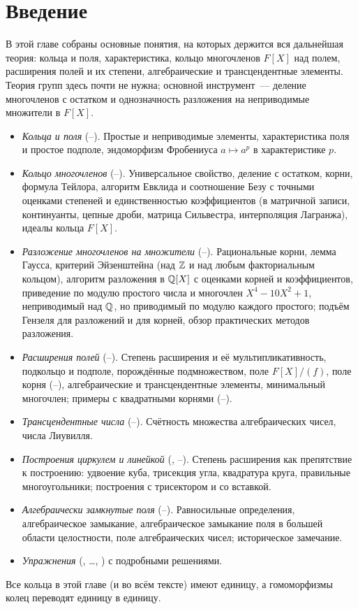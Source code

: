 \section*{Введение}

В этой главе собраны основные понятия, на которых держится вся дальнейшая теория: кольца и поля, характеристика,
кольцо многочленов $F[X]$ над полем, расширения полей и их степени, алгебраические и трансцендентные элементы. Теория
групп здесь почти не нужна; основной инструмент~--- деление многочленов с остатком и однозначность разложения на
неприводимые множители в $F[X]$.

\begin{itemize}[leftmargin=*]
\item \emph{Кольца и поля} (--). Простые и неприводимые элементы, характеристика поля и простое
подполе, эндоморфизм Фробениуса $a\mapsto a^p$ в характеристике $p$.
\item \emph{Кольцо многочленов} (--). Универсальное свойство, деление с остатком, корни, формула
Тейлора, алгоритм Евклида и соотношение Безу с точными оценками степеней и единственностью коэффициентов (в матричной
записи, континуанты, цепные дроби, матрица Сильвестра, интерполяция Лагранжа), идеалы кольца $F[X]$.
\item \emph{Разложение многочленов на множители} (--). Рациональные корни, лемма Гаусса, критерий
Эйзенштейна (над $\mathbb Z$ и над любым факториальным кольцом), алгоритм разложения в $\mathbb Q[X]$ с оценками корней и
коэффициентов, приведение по модулю простого числа и многочлен $X^4-10X^2+1$, неприводимый над $\mathbb Q$, но приводимый по
модулю каждого простого; подъём Гензеля для разложений и для корней, обзор практических методов разложения.
\item \emph{Расширения полей} (--). Степень расширения и её мультипликативность, подкольцо и подполе,
порождённые подмножеством, поле $F[X]/(f)$, поле корня (--), алгебраические и трансцендентные
элементы, минимальный многочлен; примеры с квадратными корнями (--).
\item \emph{Трансцендентные числа} (--). Счётность множества алгебраических чисел, числа Лиувилля.
\item \emph{Построения циркулем и линейкой} (, --). Степень расширения как препятствие к
построению: удвоение куба, трисекция угла, квадратура круга, правильные многоугольники; построения с трисектором и со
вставкой.
\item \emph{Алгебраически замкнутые поля} (--). Равносильные определения, алгебраическое
замыкание, алгебраическое замыкание поля в большей области целостности, поле алгебраических чисел; историческое
замечание.
\item \emph{Упражнения} (, \dots, ) с подробными решениями.
\end{itemize}

Все кольца в этой главе (и во всём тексте) имеют единицу, а гомоморфизмы колец переводят единицу в единицу.
